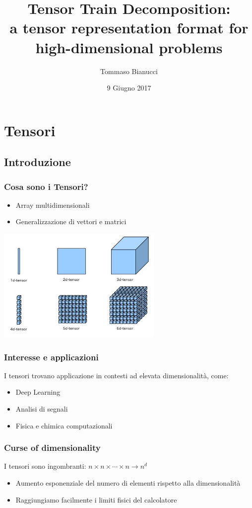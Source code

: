 \documentclass[compress]{beamer}
\title[]{Tensor Train Decomposition:\\ a tensor representation format for high-dimensional problems}
\author{Tommaso Bianucci}
\date{9 Giugno 2017}
\institute{Università di Pisa}
\theoremstyle{definition}
\theoremstyle{plain}
\begin{document}
\begin{frame}
\maketitle
\end{frame}

\section{Tensori}
\subsection{Introduzione}
\begin{frame}
\frametitle{Cosa sono i Tensori?}
\begin{itemize}
\item Array multidimensionali
\item Generalizzazione di vettori e matrici
\end{itemize}
\vspace{1mm}
\begin{center}
	\includegraphics[width=0.6\textwidth]{Img/tensors.jpg}
\end{center}
\end{frame}

\begin{frame}
\frametitle{Interesse e applicazioni}
I tensori trovano applicazione in contesti ad elevata dimensionalità, come:
\begin{itemize}
\item Deep Learning
\item Analisi di segnali
\item Fisica e chimica computazionali
\end{itemize}
\end{frame}

\begin{frame}
\frametitle{Curse of dimensionality}
I tensori sono ingombranti: \alert{$n \times n \times \cdots \times n \rightarrow n^d$}
\begin{itemize}
\item Aumento esponenziale del numero di elementi rispetto alla dimensionalità
\item Raggiungiamo facilmente i limiti fisici del calcolatore
\end{itemize}

\end{frame}	
\end{document}
